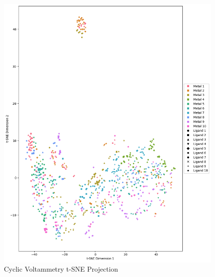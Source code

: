 \begin{figure}[!h]
  \centering
    \includegraphics[width=1.0\textwidth]{figures/cv_tsne.png}
    \caption{Cyclic Voltammetry t-SNE Projection}
    \label{cv-tsne}
\end{figure}
